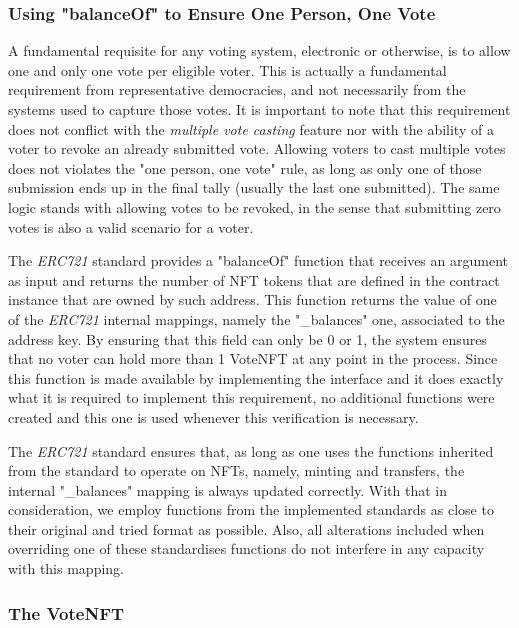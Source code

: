 \documentclass[../main.tex]{subfiles}
\begin{document}
\subsubsection{Using "balanceOf" to Ensure One Person, One Vote}
A fundamental requisite for any voting system, electronic or otherwise, is to allow one and only one vote per eligible voter. This is actually a fundamental requirement from representative democracies, and not necessarily from the systems used to capture those votes. It is important to note that this requirement does not conflict with the \textit{multiple vote casting} feature nor with the ability of a voter to revoke an already submitted vote. Allowing voters to cast multiple votes does not violates the "one person, one vote" rule, as long as only one of those submission ends up in the final tally (usually the last one submitted). The same logic stands with allowing votes to be revoked, in the sense that submitting zero votes is also a valid scenario for a voter.
\par
The \textit{ERC721} standard provides a "balanceOf" function that receives an argument as input and returns the number of NFT tokens that are defined in the contract instance that are owned by such address. This function returns the value of one of the \textit{ERC721} internal mappings, namely the "\_balances" one, associated to the address key. By ensuring that this field can only be 0 or 1, the system ensures that no voter can hold more than 1 VoteNFT at any point in the process. Since this function is made available by implementing the interface and it does exactly what it is required to implement this requirement, no additional functions were created and this one is used whenever this verification is necessary.
\par
The \textit{ERC721} standard ensures that, as long as one uses the functions inherited from the standard to operate on NFTs, namely, minting and transfers, the internal "\_balances" mapping is always updated correctly. With that in consideration, we employ functions from the implemented standards as close to their original and tried format as possible. Also, all alterations included when overriding one of these standardises functions do not interfere in any capacity with this mapping.

\subsubsection{The VoteNFT}
\end{document}
